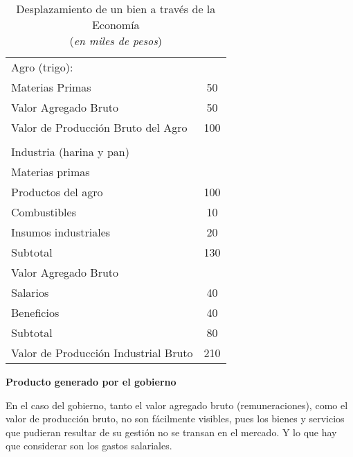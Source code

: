 \vspace{.5cm}
\begin{table}[H]
    \centering
    \caption{\\Desplazamiento de un bien a través de la Economía\\
        (\textit{en miles de pesos})}
    \vspace{.5cm}
    \begin{tabular}{lc}
        \hline
        Agro (trigo):                        &     \\
        Materias Primas                      & 50  \\
        Valor Agregado Bruto                 & 50  \\
        Valor de Producción Bruto del Agro   & 100 \\
        \hline                                     \\
        \hline
        Industria (harina y pan)             &     \\
        Materias primas                      &     \\
        \hspace{.3cm}Productos del agro      & 100 \\
        \hspace{.3cm}Combustibles            & 10  \\
        \hspace{.3cm}Insumos industriales    & 20  \\
        Subtotal                             & 130 \\
        \hline
        Valor Agregado Bruto                 &     \\
        \hspace{.3cm}Salarios                & 40  \\
        \hspace{.3cm}Beneficios              & 40  \\
        Subtotal                             & 80  \\
        \hline
        Valor de Producción Industrial Bruto & 210 \\
    \end{tabular}
\end{table}
\vspace{.5cm}

\textbf{Producto generado por el gobierno}

En el caso del gobierno,
tanto el valor agregado bruto (remuneraciones),
como el valor de producción bruto,
no son fácilmente visibles,
pues los bienes y servicios que pudieran resultar de su gestión no se transan
en el mercado. 
Y lo que hay que considerar son los gastos salariales.

